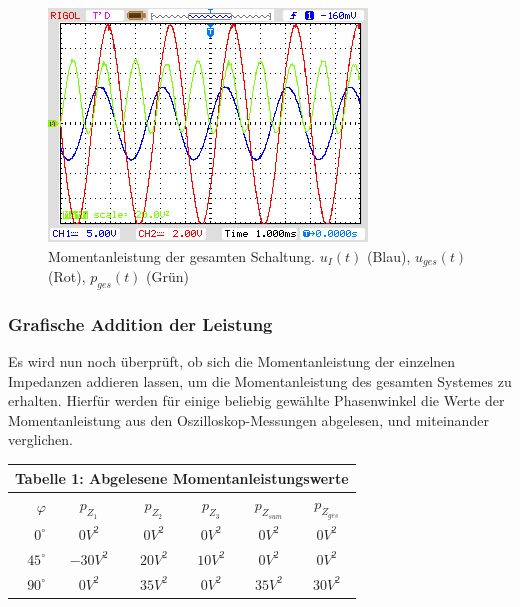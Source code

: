 \begin{figure}[H]
\centering
\includegraphics[width=0.7\linewidth]{Oszi-Bitmaps/NewFile3.jpg}
\caption{Momentanleistung der gesamten Schaltung. $u_I(t)$ (Blau), $u_{ges}(t)$ (Rot), $p_{ges}(t)$ (Grün)}
\label{fig:MomLKurveGesamt}
\end{figure}

\subsubsection{Grafische Addition der Leistung}
Es wird nun noch überprüft, ob sich die Momentanleistung der einzelnen Impedanzen addieren lassen, um die Momentanleistung des gesamten Systemes zu erhalten. Hierfür werden für einige beliebig gewählte Phasenwinkel die Werte der Momentanleistung aus den Oszilloskop-Messungen abgelesen, und miteinander verglichen.

\begin{center}
\begin{tabular}{| r | c | c | c | c | c|}
\hline
\multicolumn{6}{|c|}{Tabelle 1: Abgelesene Momentanleistungswerte} \\
\hline
$\varphi$ & $p_{Z_1}$ & $p_{Z_2}$ & $p_{Z_3}$  & $p_{Z_{sum}}$ & $p_{Z_{ges}}$ \\
\hline 
$0^\circ$ & $0V^2$ & $0V^2$ & $0V^2$ & $0V^2$ & $0V^2$ \\
$45^\circ$ & $-30V^2$ & $20V^2$ & $10V^2$ & $0V^2$ & $0V^2$\\
$90^\circ$ & $0V^2$ & $35V^2$ & $0V^2$ & $35V^2$ & $30V^2$ \\
\hline
\end{tabular}
\end{center}


